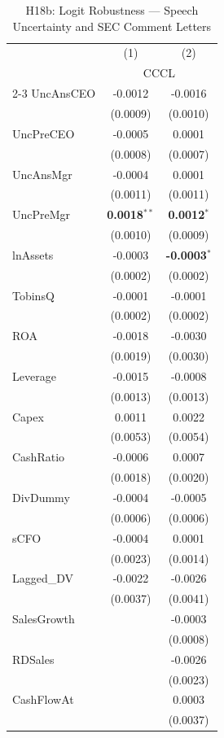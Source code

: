 \documentclass[11pt,a4paper]{article}
\begin{document}
\clearpage
\begin{table}[htbp]
\centering
\caption{H18b: Logit Robustness --- Speech Uncertainty and SEC Comment Letters}
\label{tab:h18b}
\scriptsize
\begin{tabular}{lcc}
\toprule
 & (1) & (2) \\
 & \multicolumn{2}{c}{CCCL} \\
\cmidrule(lr){2-3}
\midrule
UncAnsCEO & -0.0012 & -0.0016 \\
 & (0.0009) & (0.0010) \\
UncPreCEO & -0.0005 & 0.0001 \\
 & (0.0008) & (0.0007) \\
UncAnsMgr & -0.0004 & 0.0001 \\
 & (0.0011) & (0.0011) \\
UncPreMgr & \textbf{0.0018}$^{**}$ & \textbf{0.0012}$^{*}$ \\
 & (0.0010) & (0.0009) \\
\midrule
lnAssets & -0.0003 & \textbf{-0.0003}$^{*}$ \\
 & (0.0002) & (0.0002) \\
TobinsQ & -0.0001 & -0.0001 \\
 & (0.0002) & (0.0002) \\
ROA & -0.0018 & -0.0030 \\
 & (0.0019) & (0.0030) \\
Leverage & -0.0015 & -0.0008 \\
 & (0.0013) & (0.0013) \\
Capex & 0.0011 & 0.0022 \\
 & (0.0053) & (0.0054) \\
CashRatio & -0.0006 & 0.0007 \\
 & (0.0018) & (0.0020) \\
DivDummy & -0.0004 & -0.0005 \\
 & (0.0006) & (0.0006) \\
sCFO & -0.0004 & 0.0001 \\
 & (0.0023) & (0.0014) \\
Lagged\_DV & -0.0022 & -0.0026 \\
 & (0.0037) & (0.0041) \\
SalesGrowth &  & -0.0003 \\
 &  & (0.0008) \\
RDSales &  & -0.0026 \\
 &  & (0.0023) \\
CashFlowAt &  & 0.0003 \\
 &  & (0.0037) \\

\end{tabular}
\end{table}
\end{document}
